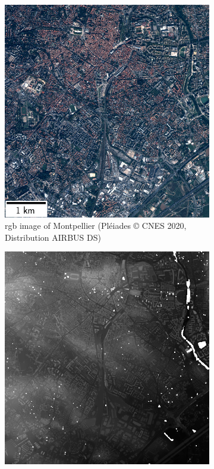 \begin{figure}
    \centering
    \begin{subfigure}[t]{0.48\linewidth}
        \flushleft
        \includegraphics[width=\linewidth]{Images/Chap_6/miniature_Montpellier.png}
        \caption{\acrshort{rgb} image of Montpellier (Pléiades © CNES 2020, Distribution AIRBUS DS)}
        \label{fig:miniature_Montpellier_rgb}
    \end{subfigure}\hfill
    \begin{subfigure}[t]{0.48\linewidth}
        \flushright
        \includegraphics[width=\linewidth]{Images/Chap_6/miniature_Montpellier_gt.png}

\end{subfigure}
\end{figure}
